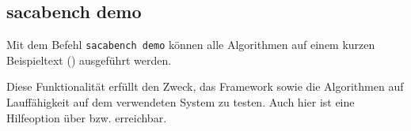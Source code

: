 \subsection{sacabench demo}
\label{framework:cli:sacabench-demo}
Mit dem Befehl \texttt{sacabench demo} können alle Algorithmen auf einem kurzen Beispieltext (\glqq {}\grqq) ausgeführt werden.\par
Diese Funktionalität erfüllt den Zweck, das Framework sowie die Algorithmen auf Lauffähigkeit auf dem verwendeten System zu testen. Auch hier ist eine Hilfeoption über  bzw.  erreichbar.\par
